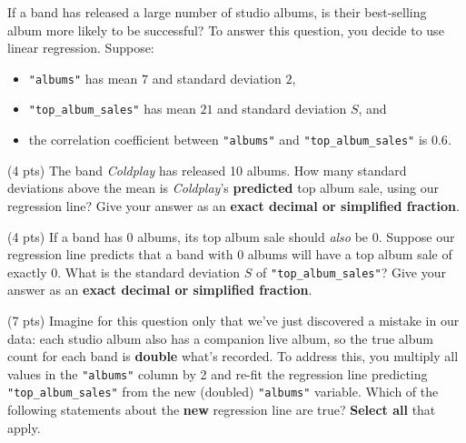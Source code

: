 \documentclass[twoside,12pt]{article}
\begin{document}
\begin{probset}
\begin{prob}[(19 pts)]

If a band has released a large number of studio albums, is their best-selling album more likely to be successful? To answer this question, you decide to use linear regression. Suppose:
\begin{itemize}
    \item \texttt{"albums"} has mean $7$ and standard deviation $2$,
    \item \texttt{"top\_album\_sales"} has mean $21$ and standard deviation $S$, and
    \item the correlation coefficient between \texttt{"albums"} and \texttt{"top\_album\_sales"} is $0.6$.
\end{itemize}

\begin{subprobset}

\begin{subprob} (4 pts) 
The band \textit{Coldplay} has released 10 albums. How many standard deviations above the mean is \textit{Coldplay}'s \textbf{predicted} top album sale, using our regression line? Give your answer as an \textbf{exact decimal or simplified fraction}.

\begin{center}
\end{center}

\end{subprob}

\bigskip

\begin{subprob} (4 pts) 
If a band has $0$ albums, its top album sale should \textit{also} be $0$. Suppose our regression line predicts that a band with $0$ albums will have a top album sale of exactly $0$. What is the standard deviation $S$ of \texttt{"top\_album\_sales"}? Give your answer as an \textbf{exact decimal or simplified fraction}.

\begin{center}
\end{center}

\end{subprob}

\bigskip

\begin{subprob} (7 pts) 
Imagine for this question only that we've just discovered a mistake in our data: each studio album also has a companion live album, so the true album count for each band is \textbf{double} what's recorded. To address this, you multiply all values in the \texttt{"albums"} column by 2 and re-fit the regression line predicting \texttt{"top\_album\_sales"} from the new (doubled) \texttt{"albums"} variable. Which of the following statements about the \textbf{new} regression line are true? \textbf{Select all} that apply.


\end{subprob}
\end{subprobset}
\end{prob}
\end{probset}
\end{document}
